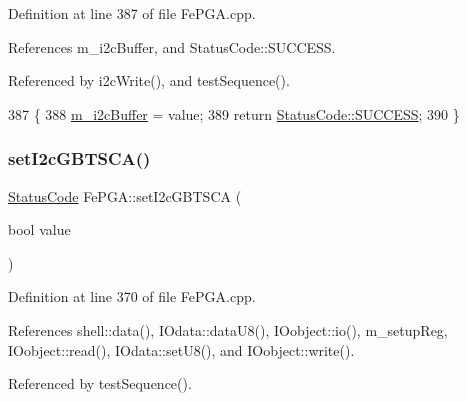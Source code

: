 Definition at line 387 of file Fe\+P\+G\+A.\+cpp.



References m\+\_\+i2c\+Buffer, and Status\+Code\+::\+S\+U\+C\+C\+E\+SS.



Referenced by i2c\+Write(), and test\+Sequence().


\begin{DoxyCode}
387                                                        \{
388   \hyperlink{classFePGA_a173664ffd6a73f454ae31f51e689dd16}{m\_i2cBuffer} = value;
389   \textcolor{keywordflow}{return} \hyperlink{classStatusCode_a6f565cbeadc76d14c72f047e5e85eb4badd0da38d3ba0d922efd1f4619bc37ad8}{StatusCode::SUCCESS};
390 \}
\end{DoxyCode}
\mbox{\label{classFePGA_ac9a16de5f01fda901494abe61efb5029}} 
\subsubsection{\texorpdfstring{set\+I2c\+G\+B\+T\+S\+C\+A()}{setI2cGBTSCA()}}
{\footnotesize\ttfamily \hyperlink{classStatusCode}{Status\+Code} Fe\+P\+G\+A\+::set\+I2c\+G\+B\+T\+S\+CA (\begin{DoxyParamCaption}\item[{bool}]{value }\end{DoxyParamCaption})}



Definition at line 370 of file Fe\+P\+G\+A.\+cpp.



References shell\+::data(), I\+Odata\+::data\+U8(), I\+Oobject\+::io(), m\+\_\+setup\+Reg, I\+Oobject\+::read(), I\+Odata\+::set\+U8(), and I\+Oobject\+::write().



Referenced by test\+Sequence().



